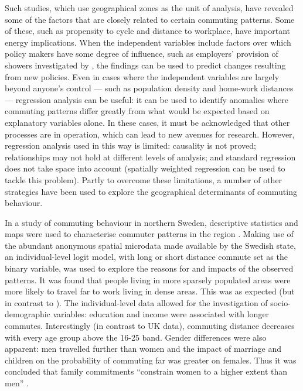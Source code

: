 Such studies, which use geographical zones as the unit of analysis,
have revealed some of the factors that are closely related to certain commuting
patterns. Some of these, such as propensity to cycle and distance to workplace,
have important energy implications. When the independent variables include
factors over which policy makers have some degree of influence, such as
employers' provision of showers investigated by \citet{Buehler2012}, the
findings can be used to predict changes resulting from new policies. Even in
cases where the independent variables are largely beyond anyone's control ---
such as population density and home-work distances ---
regression analysis can be useful: it can be used to identify anomalies
where commuting patterns differ greatly from what would be expected based on
explanatory variables alone. In these cases, it must be acknowledged that
other processes are in operation, which can lead to new avenues for research.
However, regression analysis used in this way is limited:
causality is not proved; relationships may not hold at different levels of
analysis; and standard regression does not take space into account
(spatially weighted regression can be used to tackle this problem).
Partly to overcome these limitations, a number of other strategies have
been used to explore the geographical determinants of commuting behaviour.

In a study of commuting behaviour in northern Sweden, descriptive statistics
and maps were used to characterise commuter patterns in the region \citep{Sandow2008}.
Making use of the abundant
anonymous spatial microdata made available by the Swedish state, an
individual-level logit model, with long or short distance commute
set as the binary variable,
was used to explore the reasons for and impacts of the observed patterns.
It was found that people living in more sparsely populated areas
were more likely to travel far to work living in dense areas.
This was as expected (but in contrast to \citet{Titheridge2006}).
The individual-level data allowed for the investigation of socio-demographic
variables: education and income were associated with longer commutes.
Interestingly (in contrast to UK data), commuting distance decreases
with every age group above the 16-25 band. Gender differences were also
apparent: men travelled further than women and the impact of marriage and
children on the probability of commuting far was greater on females. Thus
it was concluded that family
commitments ``constrain women to a higher extent than men''
\citep[p.~24]{Sandow2008}.

